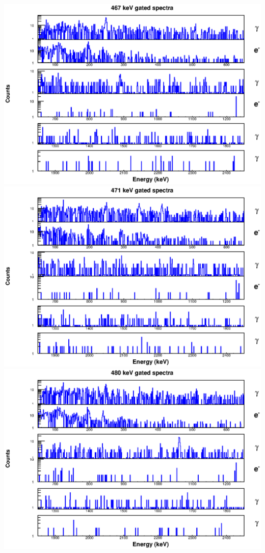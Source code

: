\includegraphics[scale=0.8]{154Gd_Appendix/467_combined.eps}
\includegraphics[scale=0.8]{154Gd_Appendix/471_combined.eps}
\includegraphics[scale=0.8]{154Gd_Appendix/480_combined.eps}
